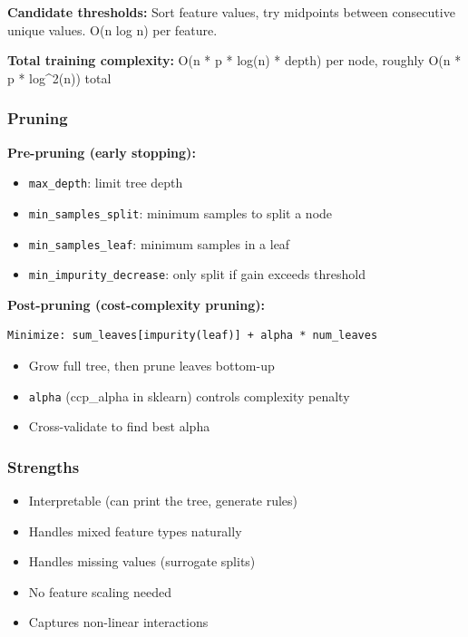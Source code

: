\documentclass[11pt]{article}
\providecommand{\tightlist}{\setlength{\itemsep}{1pt}\setlength{\parskip}{0pt}}
\begin{document}
\textbf{Candidate thresholds:} Sort feature values, try midpoints between consecutive unique values. O(n log n) per feature.

\textbf{Total training complexity:} O(n * p * log(n) * depth) per node, roughly O(n * p * log\^{}2(n)) total

\subsubsection{Pruning}\label{pruning}

\textbf{Pre-pruning (early stopping):}

\begin{itemize}
\tightlist
\item
  \texttt{max\_depth}: limit tree depth
\item
  \texttt{min\_samples\_split}: minimum samples to split a node
\item
  \texttt{min\_samples\_leaf}: minimum samples in a leaf
\item
  \texttt{min\_impurity\_decrease}: only split if gain exceeds threshold
\end{itemize}

\textbf{Post-pruning (cost-complexity pruning):}

\setcodelang{}

\begin{verbatim}
Minimize: sum_leaves[impurity(leaf)] + alpha * num_leaves
\end{verbatim}

\begin{itemize}
\tightlist
\item
  Grow full tree, then prune leaves bottom-up
\item
  \texttt{alpha} (ccp\_alpha in sklearn) controls complexity penalty
\item
  Cross-validate to find best alpha
\end{itemize}

\subsubsection{Strengths}\label{strengths}

\begin{itemize}
\tightlist
\item
  Interpretable (can print the tree, generate rules)
\item
  Handles mixed feature types naturally
\item
  Handles missing values (surrogate splits)
\item
  No feature scaling needed
\item
  Captures non-linear interactions
\end{itemize}
\end{document}
